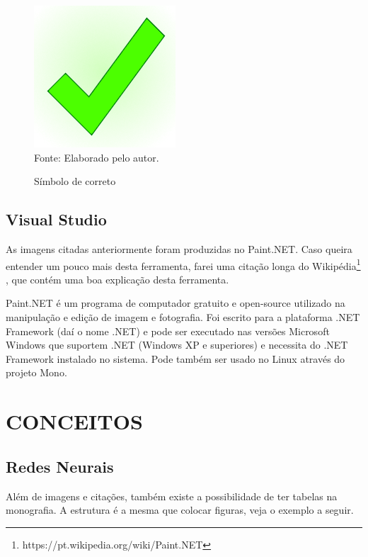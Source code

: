 \documentclass[12pt,a4paper]{article}
\newcommand{\source}[1]{Fonte: {#1}}
\begin{document}
\begin{figure}[ht!]
	\label{correto}
	\caption{Símbolo de correto}
	\centering
	\vspace{3mm}
	\includegraphics[scale=0.5]{Okay.png}\\
	\vspace{3mm}
	\source{Elaborado pelo autor.}
\end{figure}

	\subsection{Visual Studio}
	As imagens citadas anteriormente foram produzidas no Paint.NET.
	Caso queira entender um pouco mais desta ferramenta, farei uma citação longa do Wikipédia\footnote{https://pt.wikipedia.org/wiki/Paint.NET}
	, que contém uma boa explicação desta ferramenta.

\begin{longcitation}
	Paint.NET é um programa de computador gratuito e open-source utilizado na manipulação e edição de imagem e fotografia. Foi escrito para a plataforma .NET Framework (daí o nome .NET) e pode ser executado nas versões Microsoft Windows que suportem .NET (Windows XP e superiores) e necessita do .NET Framework instalado no sistema. Pode também ser usado no Linux através do projeto Mono.
\end{longcitation}
	
\section{CONCEITOS}

	\subsection{Redes Neurais}
	Além de imagens e citações, também existe a possibilidade de ter tabelas na monografia.
	A estrutura é a mesma que colocar figuras, veja o exemplo a seguir.
\end{document}
